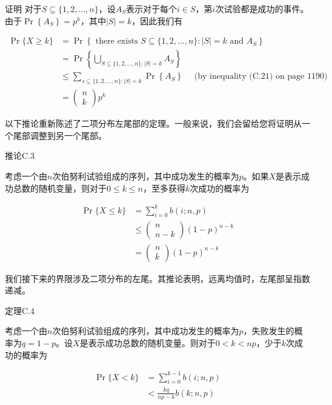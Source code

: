 \documentclass[lang=cn,newtx,10pt,scheme=chinese]{elegantbook}
\begin{document}
证明 对于$S \subseteq\{1,2, \ldots, n\}$，设$A_S$表示对于每个$i \in S$，第$i$次试验都是成功的事件。由于$\operatorname{Pr}\left\{A_S\right\}=p^k$，其中$|S|=k$，因此我们有

$$
\begin{aligned}
\operatorname{Pr}\{X \geq k\} & =\operatorname{Pr}\left\{\text { there exists } S \subseteq\{1,2, \ldots, n\}:|S|=k \text { and } A_S\right\} \\
& =\operatorname{Pr}\left\{\bigcup_{S \subseteq\{1,2, \ldots, n\}:|S|=k} A_S\right\} \\
& \leq \sum_{s \subseteq\{1,2, \ldots, n\}:|S|=k} \operatorname{Pr}\left\{A_S\right\} \quad \text { (by inequality (C.21) on page 1190) } \\
& =\left(\begin{array}{l}
n \\
k
\end{array}\right) p^k
\end{aligned}
$$

以下推论重新陈述了二项分布左尾部的定理。一般来说，我们会留给您将证明从一个尾部调整到另一个尾部。

推论C.3

考虑一个由$n$次伯努利试验组成的序列，其中成功发生的概率为$p$。如果$X$是表示成功总数的随机变量，则对于$0 \leq k \leq n$，至多获得$k$次成功的概率为

$$
\begin{aligned}
\operatorname{Pr}\{X \leq k\} & =\sum_{i=0}^k b(i ; n, p) \\
& \leq\left(\begin{array}{c}
n \\
n-k
\end{array}\right)(1-p)^{n-k} \\
& =\left(\begin{array}{l}
n \\
k
\end{array}\right)(1-p)^{n-k}
\end{aligned}
$$

我们接下来的界限涉及二项分布的左尾。其推论表明，远离均值时，左尾部呈指数递减。

定理C.4

考虑一个由$n$次伯努利试验组成的序列，其中成功发生的概率为$p$，失败发生的概率为$q=1-p$。设$X$是表示成功总数的随机变量。则对于$0<k<n p$，少于$k$次成功的概率为

$$
\begin{aligned}
\operatorname{Pr}\{X<k\} & =\sum_{i=0}^{k-1} b(i ; n, p) \\
& <\frac{k q}{n p-k} b(k ; n, p)
\end{aligned}
$$
\end{document}
